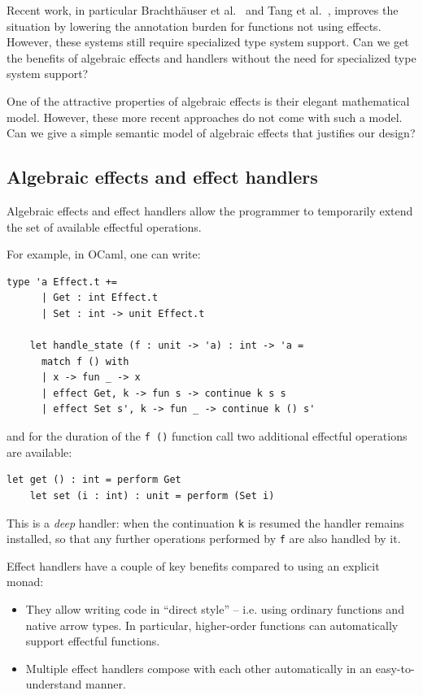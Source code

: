 \documentclass[acmsmall, screen, review, anonymous]{acmart}
\theoremstyle{definition}
\begin{document}
Recent work, in particular Brachth{\"a}user et
al.~\cite{brachthauser2022effects} and Tang et al.~\cite{tang2025modal},
improves the situation by lowering the annotation burden for functions
not using effects. However, these systems still require specialized type
system support. Can we get the benefits of algebraic effects and
handlers without the need for specialized type system support?

One of the attractive properties of algebraic effects is their elegant
mathematical model. However, these more recent approaches do not come
with such a model. Can we give a simple semantic model of algebraic
effects that justifies our design?

\subsection{Algebraic effects and effect handlers}
\label{sec:handlers}
Algebraic effects and effect handlers allow the programmer to
temporarily extend the set of available effectful operations.

For example, in OCaml, one can write:
\begin{lstlisting}[style=oxcaml]
    type 'a Effect.t +=
      | Get : int Effect.t
      | Set : int -> unit Effect.t
  
    let handle_state (f : unit -> 'a) : int -> 'a =
      match f () with
      | x -> fun _ -> x
      | effect Get, k -> fun s -> continue k s s
      | effect Set s', k -> fun _ -> continue k () s'
\end{lstlisting}
and for the duration of the \lstinline[style=oxcaml]{f ()} function call
two additional effectful operations are available:
\begin{lstlisting}[style=oxcaml]
    let get () : int = perform Get
    let set (i : int) : unit = perform (Set i)
\end{lstlisting}
This is a \emph{deep} handler: when the continuation
\lstinline[style=oxcaml]{k} is resumed the handler remains installed,
so that any further operations performed by \lstinline[style=oxcaml]{f}
are also handled by it.

Effect handlers have a couple of key benefits compared to using an explicit monad:
\begin{itemize}
\item They allow writing code in ``direct style'' -- i.e. using ordinary
  functions and native arrow types. In particular, higher-order
  functions can automatically support effectful functions.
\item
  Multiple effect handlers compose with each other automatically in an
  easy-to-understand manner.
\end{itemize}
\end{document}
